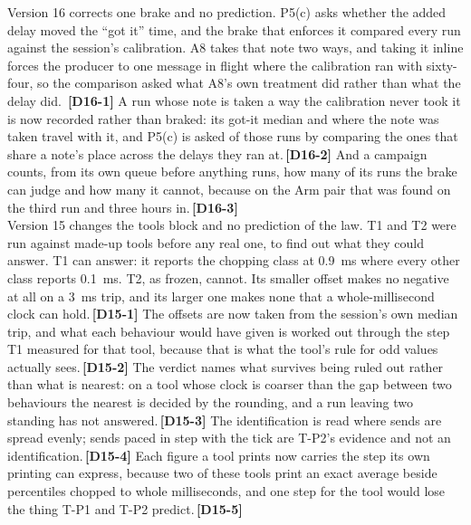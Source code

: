 \documentclass[11pt]{article}
\newcommand{\chgold}[1]{\,{\color{oldcol}\bfseries\footnotesize[#1]}}
\begin{document}
{Version 16 corrects one brake and no prediction. P5(c) asks whether the added delay moved the ``got it'' time, and the brake that enforces it compared every run against the session's calibration. A8 takes that note two ways, and taking it inline forces the producer to one message in flight where the calibration ran with sixty-four, so the comparison asked what A8's own treatment did rather than what the delay did.  \chgold{D16-1} A run whose note is taken a way the calibration never took it is now recorded rather than braked: its got-it median and where the note was taken travel with it, and P5(c) is asked of those runs by comparing the ones that share a note's place across the delays they ran at.\chgold{D16-2} And a campaign counts, from its own queue before anything runs, how many of its runs the brake can judge and how many it cannot, because on the Arm pair that was found on the third run and three hours in.\chgold{D16-3}\\[3pt]
Version 15 changes the tools block and no prediction of the law. T1 and T2 were run against made-up tools before any real one, to find out what they could answer. T1 can answer: it reports the chopping class at 0.9~ms where every other class reports 0.1~ms. T2, as frozen, cannot. Its smaller offset makes no negative at all on a 3~ms trip, and its larger one makes none that a whole-millisecond clock can hold.\chgold{D15-1} The offsets are now taken from the session's own median trip, and what each behaviour would have given is worked out through the step T1 measured for that tool, because that is what the tool's rule for odd values actually sees.\chgold{D15-2} The verdict names what survives being ruled out rather than what is nearest: on a tool whose clock is coarser than the gap between two behaviours the nearest is decided by the rounding, and a run leaving two standing has not answered.\chgold{D15-3} The identification is read where sends are spread evenly; sends paced in step with the tick are T-P2's evidence and not an identification.\chgold{D15-4} Each figure a tool prints now carries the step its own printing can express, because two of these tools print an exact average beside percentiles chopped to whole milliseconds, and one step for the tool would lose the thing T-P1 and T-P2 predict.\chgold{D15-5}\\[3pt]
}
\end{document}
